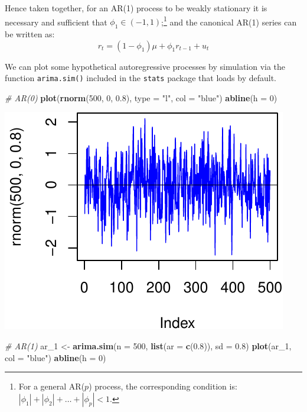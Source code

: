 \documentclass[11pt,]{article}
\newenvironment{Shaded}{\begin{snugshade}}{\end{snugshade}}
\newcommand{\KeywordTok}[1]{\textcolor[rgb]{0.13,0.29,0.53}{\textbf{#1}}}
\newcommand{\DataTypeTok}[1]{\textcolor[rgb]{0.13,0.29,0.53}{#1}}
\newcommand{\DecValTok}[1]{\textcolor[rgb]{0.00,0.00,0.81}{#1}}
\newcommand{\FloatTok}[1]{\textcolor[rgb]{0.00,0.00,0.81}{#1}}
\newcommand{\StringTok}[1]{\textcolor[rgb]{0.31,0.60,0.02}{#1}}
\newcommand{\CommentTok}[1]{\textcolor[rgb]{0.56,0.35,0.01}{\textit{#1}}}
\newcommand{\NormalTok}[1]{#1}
\let\rmarkdownfootnote\footnote%
\def\footnote{\protect\rmarkdownfootnote}
\begin{document}
Hence taken together, for an AR(1) process to be weakly stationary it is
necessary and sufficient that \(\phi_1\in(-1,1)\);\footnote{For a
  general AR(\(p\)) process, the corresponding condition is:
  \(|\phi_1|+|\phi_2|+\hdots+|\phi_p|<1\).} and the canonical AR(1)
series can be written as: \[r_t=(1-\phi_1)\mu+\phi_1r_{t-1}+u_t\]

We can plot some hypothetical autoregressive processes by simulation via
the function \texttt{arima.sim()} included in the \texttt{stats} package
that loads by default.

\begin{Shaded}
\begin{Highlighting}[]
\CommentTok{# AR(0)}
\KeywordTok{plot}\NormalTok{(}\KeywordTok{rnorm}\NormalTok{(}\DecValTok{500}\NormalTok{, }\DecValTok{0}\NormalTok{, }\FloatTok{0.8}\NormalTok{), }\DataTypeTok{type =} \StringTok{"l"}\NormalTok{, }\DataTypeTok{col =} \StringTok{"blue"}\NormalTok{)}
\KeywordTok{abline}\NormalTok{(}\DataTypeTok{h =} \DecValTok{0}\NormalTok{)}
\end{Highlighting}
\end{Shaded}

\begin{center}\includegraphics{FMC_T4_PhD_ARMA_GARCH_files/figure-latex/arima_sim-1} \end{center}

\begin{Shaded}
\begin{Highlighting}[]
\CommentTok{# AR(1)}
\NormalTok{ar_}\DecValTok{1}\NormalTok{ <-}\StringTok{ }\KeywordTok{arima.sim}\NormalTok{(}\DataTypeTok{n =} \DecValTok{500}\NormalTok{, }\KeywordTok{list}\NormalTok{(}\DataTypeTok{ar =} \KeywordTok{c}\NormalTok{(}\FloatTok{0.8}\NormalTok{)), }\DataTypeTok{sd =} \FloatTok{0.8}\NormalTok{)}
\KeywordTok{plot}\NormalTok{(ar_}\DecValTok{1}\NormalTok{, }\DataTypeTok{col =} \StringTok{"blue"}\NormalTok{)}
\KeywordTok{abline}\NormalTok{(}\DataTypeTok{h =} \DecValTok{0}\NormalTok{)}
\end{Highlighting}
\end{Shaded}
\end{document}

